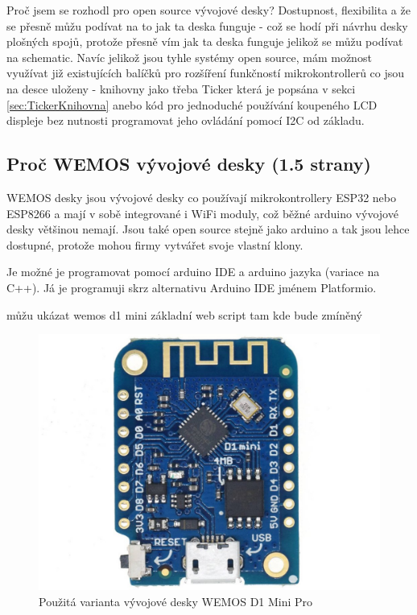 Proč jsem se rozhodl pro open source vývojové desky? Dostupnost, flexibilita a že se přesně můžu podívat na to jak ta deska funguje - což se hodí při návrhu desky plošných spojů, protože přesně vím jak ta deska funguje jelikož se můžu podívat na schematic. Navíc jelikož jsou tyhle systémy open source, mám možnost využívat již existujících balíčků pro rozšíření funkčností mikrokontrollerů co jsou na desce uloženy - knihovny jako třeba Ticker která je popsána v sekci \ref{sec:TickerKnihovna} anebo kód pro jednoduché používání koupeného LCD displeje bez nutnosti programovat jeho ovládání pomocí I2C od základu.


\subsection{Proč WEMOS vývojové desky (1.5 strany)}

WEMOS desky jsou vývojové desky co používají mikrokontrollery ESP32 nebo ESP8266 a mají v sobě integrované i WiFi moduly, což běžné arduino vývojové desky většinou nemají. Jsou také open source stejně jako arduino a tak jsou lehce dostupné, protože mohou firmy vytvářet svoje vlastní klony.

Je možné je programovat pomocí arduino IDE a arduino jazyka (variace na C++). Já je programuji skrz alternativu Arduino IDE jménem Platformio.

můžu ukázat wemos d1 mini základní web script tam kde bude zmíněný \cite{NavodNaESPWebServerDratek}


\begin{figure}[H]
    \centering
    \includegraphics[width=0.5\linewidth]{images/WEMOS_D1_Mini_Pro.jpg}
    \caption{Použitá varianta vývojové desky WEMOS D1 Mini Pro \cite{WEMOSD1MiniPro}}
    \label{fig:WEMOSD1MiniPro}
\end{figure}


